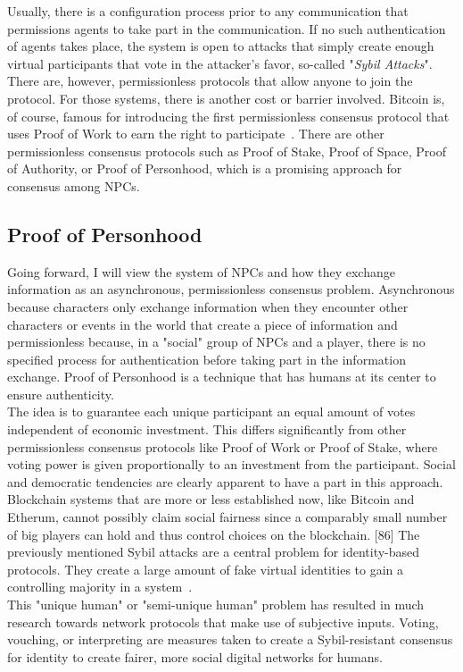 Usually, there is a configuration process prior to any communication that permissions agents to take part in the communication. If no such authentication of agents takes place, the system is open to attacks that simply create enough virtual participants that vote in the attacker's favor, so-called "\textit{Sybil Attacks}". There are, however, permissionless protocols that allow anyone to join the protocol. For those systems, there is another cost or barrier involved. Bitcoin is, of course, famous for introducing the first permissionless consensus protocol that uses Proof of Work to earn the right to participate~\cite{Gervais2016}. There are other permissionless consensus protocols such as Proof of Stake, Proof of Space, Proof of Authority, or Proof of Personhood, which is a promising approach for consensus among NPCs.~\cite{Coulouris2001}
\subsection{Proof of Personhood}
Going forward, I will view the system of NPCs and how they exchange information as an asynchronous, permissionless consensus problem. Asynchronous because characters only exchange information when they encounter other characters or events in the world that create a piece of information and permissionless because, in a "social" group of NPCs and a player, there is no specified process for authentication before taking part in the information exchange. Proof of Personhood is a technique that has humans at its center to ensure authenticity.~\cite{Borge2017}\\
The idea is to guarantee each unique participant an equal amount of votes independent of economic investment. This differs significantly from other permissionless consensus protocols like Proof of Work or Proof of Stake, where voting power is given proportionally to an investment from the participant. Social and democratic tendencies are clearly apparent to have a part in this approach. Blockchain systems that are more or less established now, like Bitcoin and Etherum, cannot possibly claim social fairness since a comparably small number of big players can hold and thus control choices on the blockchain. [86] The previously mentioned Sybil attacks are a central problem for identity-based protocols. They create a large amount of fake virtual identities to gain a controlling majority in a system~\cite{Douceur2002}.\\
This "unique human" or "semi-unique human" problem has resulted in much research towards network protocols that make use of subjective inputs. Voting, vouching, or interpreting are measures taken to create a Sybil-resistant consensus for identity to create fairer, more social digital networks for humans.~\cite{Siddarth2020}\\
